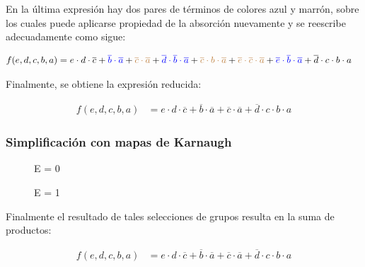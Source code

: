 En la \'ultima expresi\'on hay dos pares de t\'erminos de colores azul y marr\'on, sobre los cuales
puede aplicarse propiedad de la absorci\'on nuevamente y se reescribe adecuadamente como sigue:

\begin{align*}
f(e,d,c,b,a) & = {e \cdot d \cdot \overline{c}}
+ {\color{blue} \overline{b} \cdot \overline{a}}
+ {\color{brown} \overline{c} \cdot \overline{a}}
+ {\color{blue} \overline{d} \cdot \overline{b} \cdot \overline{a}}
+ {\color{brown} \overline{c} \cdot b \cdot \overline{a}}
+ {\color{brown} \overline{e} \cdot \overline{c} \cdot \overline{a}}
+ {\color{blue} \overline{e} \cdot \overline{b} \cdot \overline{a}}
+ {\overline{d} \cdot c \cdot b \cdot a}
\end{align*}

Finalmente, se obtiene la expresi\'on reducida:

\begin{align*}
f(e,d,c,b,a) & = {e \cdot d \cdot \overline{c}}
+ {\overline{b} \cdot \overline{a}}
+ {\overline{c} \cdot \overline{a}}
+ {\overline{d} \cdot c \cdot b \cdot a}
\end{align*}

\subsubsection{Simplificación con mapas de Karnaugh}

\begin{figure}[H]
    \centering
    \begin{Karnaugh}
    \end{Karnaugh}
    \caption{E = 0}
\end{figure}

\begin{figure}[H]
    \centering
    \begin{Karnaugh}
    \end{Karnaugh}
    \caption{E = 1}
\end{figure}

Finalmente el resultado de tales selecciones de grupos resulta en la suma de productos:

\begin{align*}
f(e,d,c,b,a) & = {e \cdot d \cdot \overline{c}}
+ {\overline{b} \cdot \overline{a}}
+ {\overline{c} \cdot \overline{a}}
+ {\overline{d} \cdot c \cdot b \cdot a}
\end{align*}

